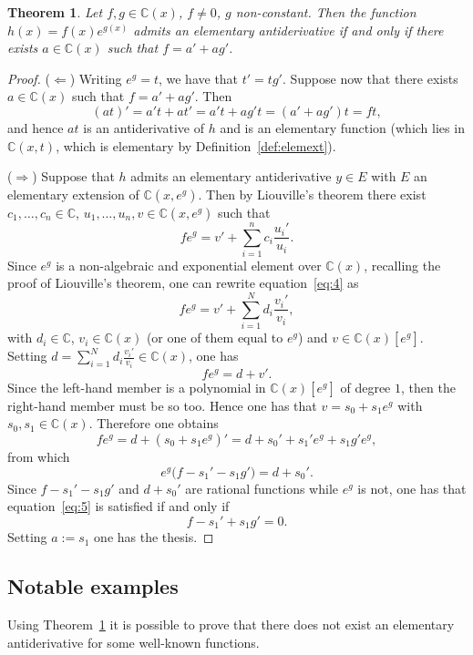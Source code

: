 \documentclass[11pt]{article}
\theoremstyle{plain}
\newtheorem{theorem}{Theorem}
\theoremstyle{definition}
\theoremstyle{remark}
\newcommand{\C}{\mathbb{C}}
\begin{document}
\begin{theorem}\label{thm:criterion}
Let $f, g \in \C(x)$, $f \neq 0$, $g$ non-constant. Then the function
$h(x) = f(x) e^{g(x)}$ admits an elementary antiderivative if and only
if there exists $a \in \C(x)$ such that $f = a' + a g'$.
\end{theorem}

\begin{proof}
($\Leftarrow$) Writing $e^{g} = t$, we have that $t' = t g'$. Suppose
now that there exists $a \in \C(x)$ such that $f = a' + a g'$. Then
\[
(a t)' = a' t + a t' = a' t + a g' t = (a' + a g') t = f t,
\]
and hence $a t$ is an antiderivative of $h$ and is an elementary
function (which lies in $\C(x, t)$, which is elementary by
Definition~\ref{def:elemext}).

($\Rightarrow$) Suppose that $h$ admits an elementary antiderivative
$y \in E$ with $E$ an elementary extension of $\C(x, e^{g})$. Then by
Liouville's theorem there exist $c_{1}, \ldots, c_{n} \in \C$,
$u_{1}, \ldots, u_{n}, v \in \C(x, e^{g})$ such that
\begin{equation}\label{eq:4}
f e^{g} = v' + \sum_{i=1}^{n} c_{i} \frac{u_{i}'}{u_{i}}.
\end{equation}
Since $e^{g}$ is a non-algebraic and exponential element over $\C(x)$,
recalling the proof of Liouville's theorem, one can rewrite
equation~\eqref{eq:4} as
\[
f e^{g} = v' + \sum_{i=1}^{N} d_{i} \frac{v_{i}'}{v_{i}},
\]
with $d_{i} \in \C$, $v_{i} \in \C(x)$ (or one of them equal to
$e^{g}$) and $v \in \C(x)[e^{g}]$. Setting
$d = \sum_{i=1}^{N} d_{i} \frac{v_{i}'}{v_{i}} \in \C(x)$, one has
\[
f e^{g} = d + v'.
\]
Since the left-hand member is a polynomial in $\C(x)[e^{g}]$ of degree
$1$, then the right-hand member must be so too. Hence one has that
$v = s_{0} + s_{1} e^{g}$ with $s_{0}, s_{1} \in \C(x)$. Therefore one
obtains
\[
f e^{g} = d + (s_{0} + s_{1} e^{g})'
= d + s_{0}' + s_{1}' e^{g} + s_{1} g' e^{g},
\]
from which
\begin{equation}\label{eq:5}
e^{g}\bigl(f - s_{1}' - s_{1} g'\bigr) = d + s_{0}'.
\end{equation}
Since $f - s_{1}' - s_{1} g'$ and $d + s_{0}'$ are rational functions
while $e^{g}$ is not, one has that equation~\eqref{eq:5} is satisfied
if and only if
\[
f - s_{1}' + s_{1} g' = 0.
\]
Setting $a := s_{1}$ one has the thesis.
\end{proof}

\subsection*{Notable examples}
Using Theorem~\ref{thm:criterion} it is possible to prove that there
does not exist an elementary antiderivative for some well-known
functions.
\end{document}
